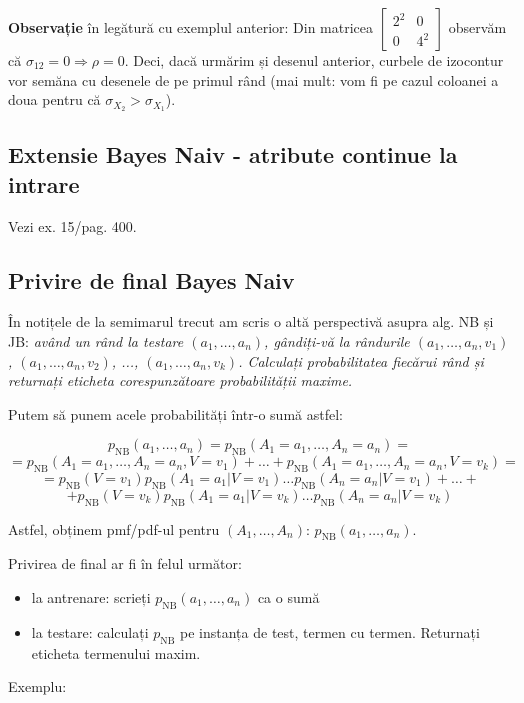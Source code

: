\documentclass[12pt]{article}
\begin{document}
	\textbf{Observație} în legătură cu exemplul anterior: Din matricea $\begin{bmatrix}
	2^2 & 0\\
	0 & 4^2
	\end{bmatrix}$ observăm că $\sigma_{12} = 0 \Rightarrow \rho = 0$. Deci, dacă urmărim și desenul anterior, curbele de izocontur vor semăna cu desenele de pe primul rând (mai mult: vom fi pe cazul coloanei a doua pentru că $\sigma_{X_2} > \sigma_{X_1}$).
	
	\subsection{Extensie Bayes Naiv - atribute continue la intrare}
	
	Vezi ex. 15/pag. 400.
	
	\subsection{Privire de final Bayes Naiv}
	
	În notițele de la semimarul trecut am scris o altă perspectivă asupra alg. NB și JB: \textit{având un rând la testare $(a_1,\dots,a_n)$, gândiți-vă la rândurile $(a_1,\dots,a_n,v_1)$, $(a_1,\dots,a_n,v_2)$, ..., $(a_1,\dots,a_n,v_k)$. Calculați probabilitatea fiecărui rând și returnați eticheta corespunzătoare probabilității maxime.}
	
	Putem să punem acele probabilități într-o sumă astfel:
	
	$$p_\text{NB}(a_1,\dots,a_n) = p_\text{NB}(A_1=a_1,\dots,A_n=a_n) =$$
	$$= p_\text{NB}(A_1=a_1,\dots,A_n=a_n,V=v_1) + \dots + p_\text{NB}(A_1=a_1,\dots,A_n=a_n,V=v_k) = $$
	$$= p_\text{NB}(V=v_1)p_\text{NB}(A_1=a_1|V=v_1)\dots p_\text{NB}(A_n = a_n|V=v_1) + \dots + $$
	$$+ p_\text{NB}(V=v_k)p_\text{NB}(A_1=a_1|V=v_k)\dots p_\text{NB}(A_n = a_n|V=v_k)$$
	
	Astfel, obținem pmf/pdf-ul pentru $(A_1,\dots,A_n)$: $p_\text{NB}(a_1,\dots,a_n)$.
	
	Privirea de final ar fi în felul următor:
	\begin{itemize}
		\item la antrenare: scrieți $p_\text{NB}(a_1,\dots,a_n)$ ca o sumă
		\item la testare: calculați $p_\text{NB}$ pe instanța de test, termen cu termen. Returnați eticheta termenului maxim.
	\end{itemize}
	
	Exemplu:
	
\end{document}
